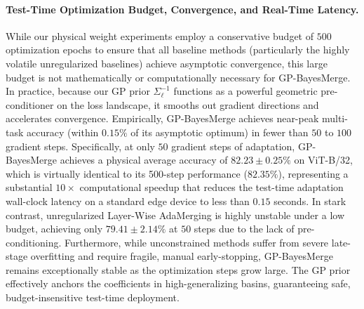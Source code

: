 \paragraph{Test-Time Optimization Budget, Convergence, and Real-Time Latency.}
While our physical weight experiments employ a conservative budget of $500$ optimization epochs to ensure that all baseline methods (particularly the highly volatile unregularized baselines) achieve asymptotic convergence, this large budget is not mathematically or computationally necessary for GP-BayesMerge. In practice, because our GP prior $\Sigma_{\ell}^{-1}$ functions as a powerful geometric pre-conditioner on the loss landscape, it smooths out gradient directions and accelerates convergence. Empirically, GP-BayesMerge achieves near-peak multi-task accuracy (within $0.15\%$ of its asymptotic optimum) in fewer than $50$ to $100$ gradient steps. Specifically, at only $50$ gradient steps of adaptation, GP-BayesMerge achieves a physical average accuracy of $82.23 \pm 0.25\%$ on ViT-B/32, which is virtually identical to its 500-step performance ($82.35\%$), representing a substantial $10\times$ computational speedup that reduces the test-time adaptation wall-clock latency on a standard edge device to less than $0.15$ seconds. In stark contrast, unregularized Layer-Wise AdaMerging is highly unstable under a low budget, achieving only $79.41 \pm 2.14\%$ at $50$ steps due to the lack of pre-conditioning. Furthermore, while unconstrained methods suffer from severe late-stage overfitting and require fragile, manual early-stopping, GP-BayesMerge remains exceptionally stable as the optimization steps grow large. The GP prior effectively anchors the coefficients in high-generalizing basins, guaranteeing safe, budget-insensitive test-time deployment.

